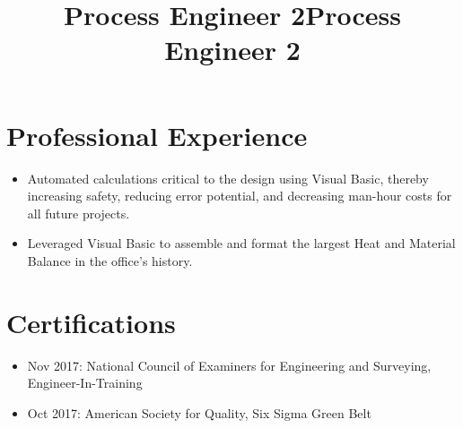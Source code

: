 \documentclass[12pt]{res} %
\begin{document}
\begin{resume}
      \section{Professional Experience}
        \title{\textbf{Process Engineer 2}}
        \begin{position}
          \vspace{-14pt}
          \begin{itemize}[leftmargin=-0.4cm]
          \itemsep0em
          \item Automated calculations critical to the design using Visual Basic, thereby increasing safety, reducing error potential, and decreasing man-hour costs for all future projects.
          \end{itemize}
        \end{position}
        \vspace{-10pt}

        \title{\textbf{Process Engineer 2}}
        \begin{position}
          \vspace{-14pt}
          \begin{itemize}[leftmargin=-0.4cm]
              \itemsep0em
              \item Leveraged Visual Basic to assemble and format the largest Heat and Material Balance in the office's history.
          \end{itemize}
        \end{position}
        \vspace{-12pt}

      \section{Certifications} 
        \begin{itemize}[leftmargin=-0.4cm]
        \itemsep0em
        \item Nov 2017: National Council of Examiners for Engineering and Surveying, Engineer-In-Training
        \item Oct 2017: American Society for Quality, Six Sigma Green Belt
        \end{itemize}
        \vspace{-12pt}

    \end{resume}

\vspace*{\fill}
\end{document}

